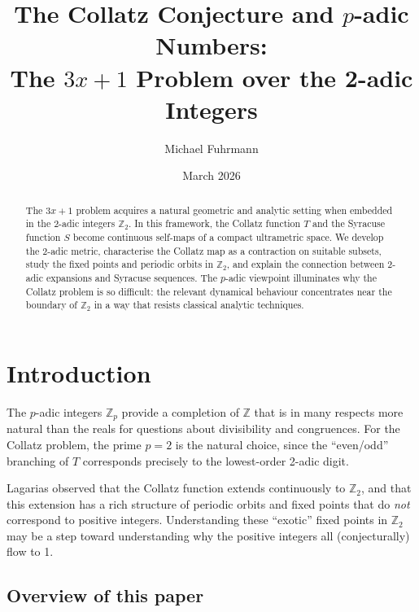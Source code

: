 \documentclass[12pt,a4paper]{article}
\begin{document}
\title{The Collatz Conjecture and $p$-adic Numbers:\\
The $3x+1$ Problem over the 2-adic Integers}
\author{Michael Fuhrmann}
\date{March 2026}
\maketitle

\begin{abstract}
The $3x+1$ problem acquires a natural geometric and analytic setting when embedded in the
2-adic integers $\mathbb{Z}_2$. In this framework, the Collatz function $T$ and the
Syracuse function $S$ become continuous self-maps of a compact ultrametric space. We
develop the 2-adic metric, characterise the Collatz map as a contraction on suitable
subsets, study the fixed points and periodic orbits in $\mathbb{Z}_2$, and explain the
connection between 2-adic expansions and Syracuse sequences. The $p$-adic viewpoint
illuminates why the Collatz problem is so difficult: the relevant dynamical behaviour
concentrates near the boundary of $\mathbb{Z}_2$ in a way that resists classical
analytic techniques.
\end{abstract}

\tableofcontents

\newpage

\section{Introduction}

The $p$-adic integers $\mathbb{Z}_p$ provide a completion of $\mathbb{Z}$ that is in
many respects more natural than the reals for questions about divisibility and
congruences. For the Collatz problem, the prime $p = 2$ is the natural choice, since
the ``even/odd'' branching of $T$ corresponds precisely to the lowest-order 2-adic digit.

Lagarias \cite{Lagarias1985} observed that the Collatz function extends continuously to
$\mathbb{Z}_2$, and that this extension has a rich structure of periodic orbits and
fixed points that do \emph{not} correspond to positive integers. Understanding these
``exotic'' fixed points in $\mathbb{Z}_2$ may be a step toward understanding why the
positive integers all (conjecturally) flow to 1.

\subsection{Overview of this paper}
\end{document}
